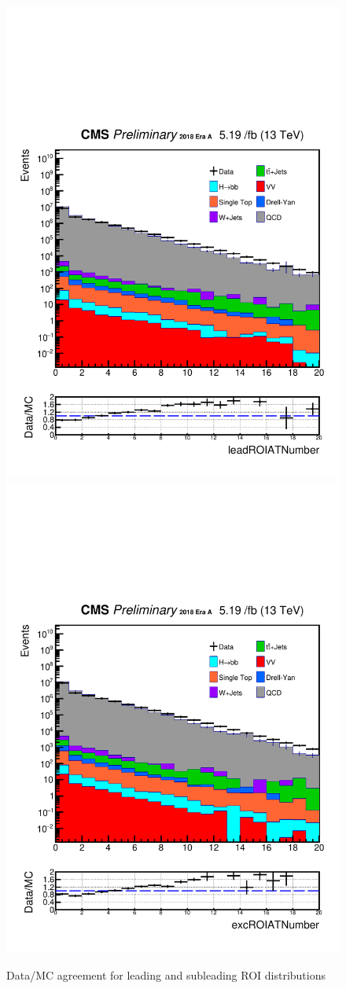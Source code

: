 \begin{figure}[h!]
  \label{fig:DataMCscore4}
  \centering
  \includegraphics[width=0.57\linewidth]{figs/Data_log_Oct6ANVars_MS-15_ctauS-10_leadROIATNumber.pdf}
  \includegraphics[width=0.57\linewidth]{figs/Data_log_Oct6ANVars_MS-15_ctauS-10_excROIATNumber.pdf}
  \caption{Data/MC agreement for leading and subleading ROI distributions}

\end{figure}

